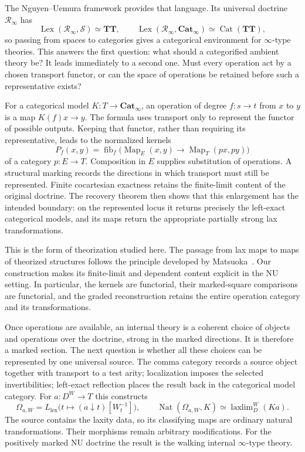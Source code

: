 \documentclass[oneside]{article}
\theoremstyle{plain}
\theoremstyle{definition}
\theoremstyle{remark}
\newcommand{\Cat}{\mathbf{Cat}_{\infty}}
\newcommand{\Lex}{\operatorname{Lex}}
\newcommand{\Map}{\operatorname{Map}}
\newcommand{\Nat}{\operatorname{Nat}}
\newcommand{\RNU}{\mathcal R_{\infty}}
\newcommand{\Sps}{\mathcal S}
\newcommand{\TT}{\mathbf{TT}}
\newcommand{\fib}{\operatorname{fib}}
\newcommand{\laxlim}{\mathop{\mathrm{laxlim}}}
\begin{document}
The Nguyen--Uemura framework provides that language. Its universal doctrine
$\RNU$ has
\[
 \Lex(\RNU,\Sps)\simeq\TT,
 \qquad
 \Lex(\RNU,\Cat)\simeq\operatorname{Cat}(\TT),
\]
so passing from spaces to categories gives a categorical environment for
$\infty$-type theories. This answers the first question: what should a
categorified ambient theory be? It leads immediately to a second one.
Must every operation act by a chosen transport functor, or can the space
of operations be retained before such a representative exists?

For a categorical model $K:T\to\Cat$, an operation of degree $f:s\to t$
from $x$ to $y$ is a map $K(f)x\to y$. The formula uses transport only to
represent the functor of possible outputs. Keeping that functor, rather
than requiring its representative, leads to the normalized kernels
\[
 P_f(x,y)=
 \fib_f\bigl(\Map_E(x,y)\longrightarrow\Map_T(px,py)\bigr)
\]
of a category $p:E\to T$. Composition in $E$ supplies substitution of
operations. A structural marking records the directions in which
transport must still be represented. Finite cocartesian exactness retains
the finite-limit content of the original doctrine. The recovery theorem
then shows that this enlargement has the intended boundary: on the
represented locus it returns precisely the left-exact categorical models,
and its maps return the appropriate partially strong lax transformations.

This is the form of theorization studied here. The passage from lax maps
to maps of theorized structures follows the principle developed by
Matsuoka~\cite{Matsuoka2017}. Our construction makes its finite-limit and
dependent content explicit in the NU setting. In particular, the kernels
are functorial, their marked-square comparisons are functorial, and the
graded reconstruction retains the entire operation category and its
transformations.

Once operations are available, an internal theory is a coherent choice
of objects and operations over the doctrine, strong in the marked
directions. It is therefore a marked section. The next question is whether
all these choices can be represented by one universal source. The comma
category records a source object together with transport to a test arity;
localization imposes the selected invertibilities; left-exact reflection
places the result back in the categorical model category. For
$a:D^W\to T$ this constructs
\[
 \Omega_{a,W}
 =L_{\mathrm{lex}}\bigl(t\longmapsto(a\downarrow t)[W_t^{-1}]\bigr),
 \qquad
 \Nat(\Omega_{a,W},K)\simeq\laxlim_D^W(Ka).
\]
The source contains the laxity data, so its classifying maps are ordinary
natural transformations. Their morphisms remain arbitrary modifications.
For the positively marked NU doctrine the result is the walking internal
$\infty$-type theory.
\end{document}
